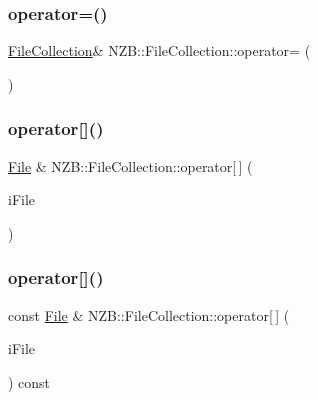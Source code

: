 \hypertarget{class_n_z_b_1_1_file_collection_a9a39412f971ae08850615fd4eaca730a}{}\label{class_n_z_b_1_1_file_collection_a9a39412f971ae08850615fd4eaca730a} 
\subsubsection{\texorpdfstring{operator=()}{operator=()}\hspace{0.1cm}{\footnotesize\ttfamily [2/2]}}
{\footnotesize\ttfamily \hyperlink{class_n_z_b_1_1_file_collection}{File\+Collection}\& N\+Z\+B\+::\+File\+Collection\+::operator= (\begin{DoxyParamCaption}\item[{const \hyperlink{class_n_z_b_1_1_file_collection}{File\+Collection} \&}]{ }\end{DoxyParamCaption})\hspace{0.3cm}{\ttfamily [delete]}}

\hypertarget{class_n_z_b_1_1_file_collection_a60d75d8e870b9360ff0f03596ffd3885}{}\label{class_n_z_b_1_1_file_collection_a60d75d8e870b9360ff0f03596ffd3885} 
\subsubsection{\texorpdfstring{operator[]()}{operator[]()}\hspace{0.1cm}{\footnotesize\ttfamily [1/2]}}
{\footnotesize\ttfamily \hyperlink{class_n_z_b_1_1_file}{File} \& N\+Z\+B\+::\+File\+Collection\+::operator\mbox{[}$\,$\mbox{]} (\begin{DoxyParamCaption}\item[{int}]{i\+File }\end{DoxyParamCaption})}

\hypertarget{class_n_z_b_1_1_file_collection_a169b09f36849f6e0c842939ae61cc383}{}\label{class_n_z_b_1_1_file_collection_a169b09f36849f6e0c842939ae61cc383} 
\subsubsection{\texorpdfstring{operator[]()}{operator[]()}\hspace{0.1cm}{\footnotesize\ttfamily [2/2]}}
{\footnotesize\ttfamily const \hyperlink{class_n_z_b_1_1_file}{File} \& N\+Z\+B\+::\+File\+Collection\+::operator\mbox{[}$\,$\mbox{]} (\begin{DoxyParamCaption}\item[{int}]{i\+File }\end{DoxyParamCaption}) const}



